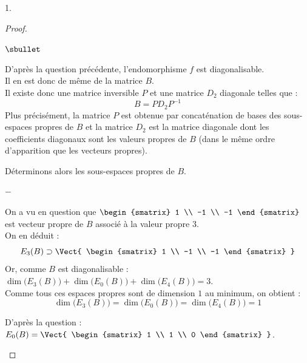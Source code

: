 \begin{noliste}{1.}
  \begin{proof}~%
    \begin{noliste}{$\sbullet$}
    \item D'après la question précédente, l'endomorphisme $f$ est
      diagonalisable.\\
      Il en est donc de même de la matrice $B$.\\
      Il existe donc une matrice inversible $P$ et une matrice $D_2$
      diagonale telles que :
      \[
      B = P D_2 P^{-1}
      \]
      Plus précisément, la matrice $P$ est obtenue par concaténation
      de bases des sous-espaces propres de $B$ et la matrice $D_2$ est
      la matrice diagonale dont les coefficients diagonaux sont les
      valeurs propres de $B$ (dans le même ordre d'apparition que les
      vecteurs propres).
    \item Déterminons alors les sous-espaces propres de $B$.
      \begin{noliste}{$-$}
      \item On a vu en question  que $
        \begin{smatrix}
          1 \\
          -1 \\
          -1
        \end{smatrix}
        $ est vecteur propre de $B$ associé à la valeur propre $3$.\\
        On en déduit :
        \[
        E_3(B) \supset \Vect{
          \begin{smatrix}
            1 \\
            -1 \\
            -1            
          \end{smatrix}
        }
        \]
        Or, comme $B$ est diagonalisable : $\dim\big( E_3(B) \big) +
        \dim\big( E_0(B) \big) + \dim\big( E_4(B) \big) = 3$.\\
        Comme tous ces espaces propres sont de dimension $1$ au
        minimum, on obtient : 
        \[
        \dim\big( E_3(B) \big) = \dim\big( E_0(B) \big) = \dim\big(
        E_4(B) \big) = 1
        \]

      \item D'après la question  : $E_0(B) = \Vect{
          \begin{smatrix}
            1 \\
            1 \\
            0
          \end{smatrix}
        }$.
        

\end{noliste}
\end{noliste}
\end{proof}
\end{noliste}
